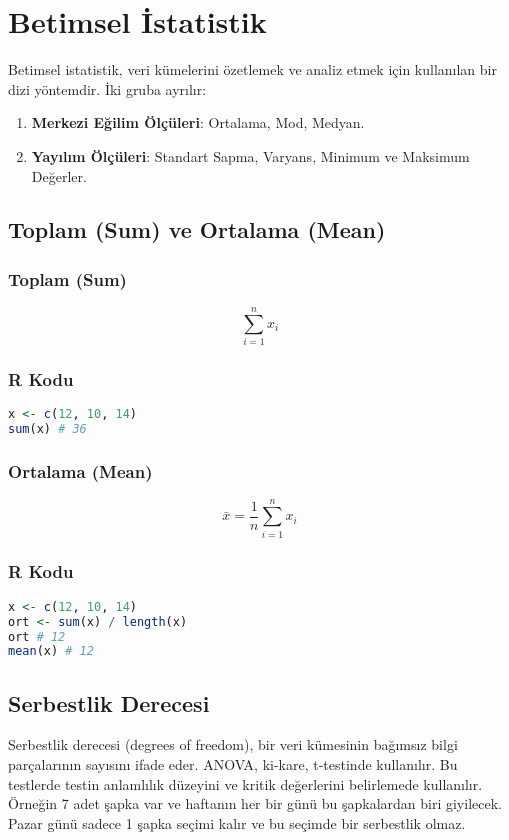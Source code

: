 \section{Betimsel İstatistik}
Betimsel istatistik, veri kümelerini özetlemek ve analiz etmek için kullanılan bir dizi yöntemdir. İki gruba ayrılır:
\begin{enumerate}
	\item \textbf{Merkezi Eğilim Ölçüleri}: Ortalama, Mod, Medyan.
	\item \textbf{Yayılım Ölçüleri}: Standart Sapma, Varyans, Minimum ve Maksimum Değerler.
\end{enumerate}

\newpage

\subsection{Toplam (Sum) ve Ortalama (Mean)}
\subsubsection{Toplam (Sum)}

\[
\sum_{i=1}^{n} x_i
\]

\subsubsection{R Kodu}

\begin{lstlisting}[language=R]
x <- c(12, 10, 14)
sum(x) # 36
\end{lstlisting}

\newpage

\subsubsection{Ortalama (Mean)}

\[
\bar{x} = \frac{1}{n} \sum_{i=1}^{n} x_i
\]

\subsubsection{R Kodu}

\begin{lstlisting}[language=R]
x <- c(12, 10, 14)
ort <- sum(x) / length(x)
ort # 12
mean(x) # 12
\end{lstlisting}

\newpage

\subsection{Serbestlik Derecesi}
Serbestlik derecesi (degrees of freedom), bir veri kümesinin bağımsız bilgi parçalarının sayısını ifade eder. ANOVA, ki-kare, t-testinde kullanılır. Bu testlerde testin anlamlılık düzeyini ve kritik değerlerini belirlemede kullanılır. Örneğin 7 adet şapka var ve haftanın her bir günü bu şapkalardan biri giyilecek. Pazar günü sadece 1 şapka seçimi kalır ve bu seçimde bir serbestlik olmaz.

